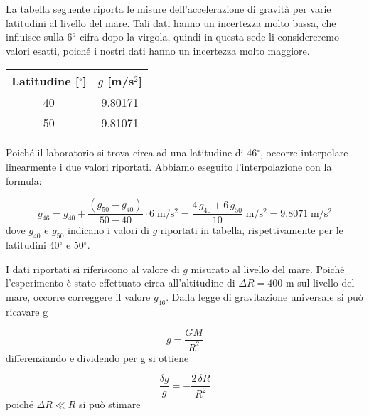 
\label{g_confronto}

La tabella seguente riporta le misure dell'accelerazione di gravità
per varie latitudini al livello del mare. Tali dati hanno un incertezza molto bassa,
che influisce sulla 6$^a$ cifra dopo la virgola, quindi in questa sede li considereremo valori esatti,
poiché i nostri dati hanno un incertezza molto maggiore.

\begin{center}
    \begin{tabular}{c c}
        \toprule
        Latitudine [$^\circ$] & $g$ [m/s$^2$] \\
        \midrule
        40 & 9.80171 \\
        50 & 9.81071 \\
        \bottomrule
    \end{tabular}
\end{center}

Poiché il laboratorio si trova circa ad una latitudine di 46$^\circ$, occorre interpolare linearmente i due valori
riportati. Abbiamo eseguito l'interpolazione con la formula:

\begin{equation}
    g_{46} = g_{40} + \frac{(g_{50} - g_{40})}{50 - 40} \cdot 6 \; \si{\meter\per\square\second} =
    \frac{4\, g_{40} + 6\, g_{50}}{10} \; \si{\meter\per\square\second} =
    9.8071 \; \si{\meter\per\square\second}
    \label{eq:g46}
\end{equation}
%
dove $g_{40}$ e $g_{50}$ indicano i valori di $g$ riportati in tabella, rispettivamente per le latitudini 40$^\circ$ e 50$^\circ$.

I dati riportati si riferiscono al valore di $g$ misurato al livello del mare. Poiché l'esperimento è stato effettuato circa all'altitudine di
$\Delta R = 400$ m sul livello del mare, occorre correggere il valore $g_{46}$. Dalla legge di gravitazione universale si può ricavare g

\begin{equation}
    g = \frac{GM}{R^2}
\end{equation}
%
differenziando e dividendo per g si ottiene

\begin{equation}
    \frac{\delta g}{g} = - \frac{2\,\delta R}{R^2}
\end{equation}
%
poiché $\Delta R \ll R$ si può stimare


